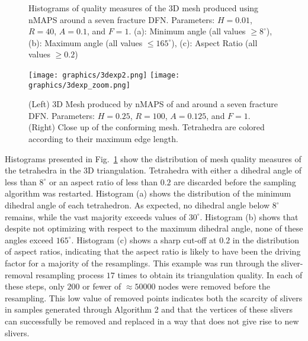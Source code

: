 \documentclass[preprint, 10pt]{elsarticle}
\theoremstyle{definition}
\theoremstyle{remark}
\begin{document}
\begin{figure}
	\centering
	
	\caption{Histograms of quality measures of the 3D mesh produced using nMAPS around a seven fracture DFN. Parameters: $H=0.01$, $R=40$, $A=0.1$, and $F=1$. (a): Minimum angle (all values $\ge 8^\circ$), (b): Maximum angle (all values $\le 165^\circ$), (c): Aspect Ratio (all values $\ge 0.2$)}
	\label{fig:3dhist}
\end{figure}


\begin{figure*}
	\centering
\texttt{[image: graphics/3dexp2.png]}	\texttt{[image: graphics/3dexp\_zoom.png]}
	\caption{(Left) 3D Mesh produced by nMAPS of and around a seven fracture DFN. Parameters: $H=0.25$, $R=100$, $A=0.125$, and  $F=1$. (Right) Close up of the conforming mesh. Tetrahedra are colored according to their maximum edge length.}
	\label{fig:3d-mixzoomfin}
\end{figure*}


Histograms presented in Fig.~\ref{fig:3dhist} show the distribution of mesh quality measures of the tetrahedra in the 3D triangulation. 
Tetrahedra with either a dihedral angle of less than $8^\circ$ or an aspect ratio of less than $0.2$ are discarded before the sampling algorithm was restarted.  
Histogram (a) shows the distribution of the minimum dihedral angle of each tetrahedron. 
As expected, no dihedral angle below $8^\circ$ remains, while the vast majority exceeds values of $30^\circ$. 
Histogram (b) shows that despite not optimizing with respect to the maximum dihedral angle, none of these angles exceed $165^\circ$. 
Histogram (c) shows a sharp cut-off at $0.2$ in the distribution of aspect ratios, indicating that the aspect ratio is likely to have been the driving factor for a majority of the resamplings.  
This example was run through the sliver-removal resampling process $17$ times to obtain its triangulation quality. 
In each of these steps, only $200$ or fewer of $\approx 50000$ nodes were removed before the resampling. 
This low value of removed points indicates both the scarcity of slivers in samples generated through Algorithm 2 and that the vertices of these slivers can successfully be removed and replaced in a way that does not give rise to new slivers.
\end{document}
